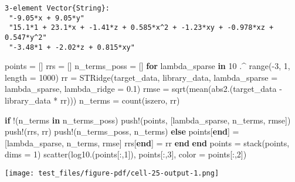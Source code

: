 \documentclass[
]{article}
\newenvironment{Shaded}{\begin{snugshade}}{\end{snugshade}}
\newcommand{\ControlFlowTok}[1]{\textcolor[rgb]{0.00,0.23,0.31}{\textbf{#1}}}
\newcommand{\FloatTok}[1]{\textcolor[rgb]{0.68,0.00,0.00}{#1}}
\newcommand{\FunctionTok}[1]{\textcolor[rgb]{0.28,0.35,0.67}{#1}}
\newcommand{\KeywordTok}[1]{\textcolor[rgb]{0.00,0.23,0.31}{\textbf{#1}}}
\newcommand{\NormalTok}[1]{\textcolor[rgb]{0.00,0.23,0.31}{#1}}
\newcommand{\OperatorTok}[1]{\textcolor[rgb]{0.37,0.37,0.37}{#1}}
\begin{document}
\begin{verbatim}
3-element Vector{String}:
 "-9.05*x + 9.05*y"
 "15.1*1 + 23.1*x + -1.41*z + 0.585*x^2 + -1.23*xy + -0.978*xz + 0.547*y^2"
 "-3.48*1 + -2.02*z + 0.815*xy"
\end{verbatim}

\begin{Shaded}
\begin{Highlighting}[]
\NormalTok{points }\OperatorTok{=}\NormalTok{ []}
\NormalTok{rrs }\OperatorTok{=}\NormalTok{ []}
\NormalTok{n\_terms\_poss }\OperatorTok{=}\NormalTok{ []}
\ControlFlowTok{for}\NormalTok{ lambda\_sparse }\KeywordTok{in} \FloatTok{10} \OperatorTok{.\^{}} \FunctionTok{range}\NormalTok{(}\OperatorTok{{-}}\FloatTok{3}\NormalTok{, }\FloatTok{1}\NormalTok{, length }\OperatorTok{=} \FloatTok{1000}\NormalTok{)}
\NormalTok{  rr }\OperatorTok{=} \FunctionTok{STRidge}\NormalTok{(target\_data, library\_data, lambda\_sparse }\OperatorTok{=}\NormalTok{ lambda\_sparse, lambda\_ridge }\OperatorTok{=} \FloatTok{0.1}\NormalTok{)}
\NormalTok{  rmse }\OperatorTok{=} \FunctionTok{sqrt}\NormalTok{(}\FunctionTok{mean}\NormalTok{(}\FunctionTok{abs2}\NormalTok{.(target\_data }\OperatorTok{{-}}\NormalTok{ library\_data }\OperatorTok{*}\NormalTok{ rr)))}
\NormalTok{  n\_terms }\OperatorTok{=} \FunctionTok{count}\NormalTok{(iszero, rr)}

  \ControlFlowTok{if}\NormalTok{ !(n\_terms }\KeywordTok{in}\NormalTok{ n\_terms\_poss)}
    \FunctionTok{push!}\NormalTok{(points, [lambda\_sparse, n\_terms, rmse])}
    \FunctionTok{push!}\NormalTok{(rrs, rr)}
    \FunctionTok{push!}\NormalTok{(n\_terms\_poss, n\_terms)}
  \ControlFlowTok{else}
\NormalTok{    points[}\KeywordTok{end}\NormalTok{] }\OperatorTok{=}\NormalTok{ [lambda\_sparse, n\_terms, rmse]}
\NormalTok{    rrs[}\KeywordTok{end}\NormalTok{] }\OperatorTok{=}\NormalTok{ rr}
  \ControlFlowTok{end}
\ControlFlowTok{end}
\NormalTok{points }\OperatorTok{=} \FunctionTok{stack}\NormalTok{(points, dims }\OperatorTok{=} \FloatTok{1}\NormalTok{)}
\FunctionTok{scatter}\NormalTok{(}\FunctionTok{log10}\NormalTok{.(points[}\OperatorTok{:}\NormalTok{,}\FloatTok{1}\NormalTok{]), points[}\OperatorTok{:}\NormalTok{,}\FloatTok{3}\NormalTok{], color }\OperatorTok{=}\NormalTok{ points[}\OperatorTok{:}\NormalTok{,}\FloatTok{2}\NormalTok{])}
\end{Highlighting}
\end{Shaded}

\texttt{[image: test\_files/figure-pdf/cell-25-output-1.png]}
\end{document}
